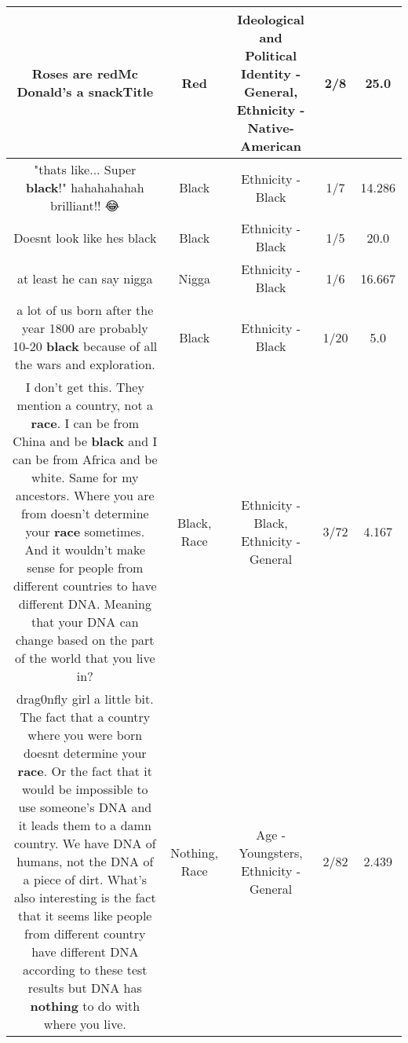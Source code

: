 \documentclass[11pt]{article}
\newlength\mylength
\begin{document}
\begin{center}
\begin{longtable}{|C{.65\mylength}|C{.30\mylength}|C{.12\mylength}|C{.12\mylength}|C{.12\mylength}|}
  \small Roses are \textbf{r\textbf{ed}}Mc Donald's a snackTitle\normalsize   & Red &  Ideological and Political Identity - General, Ethnicity - Native-American & 2/8 & 25.0 \\  \hline
  \small "thats like... Super \textbf{black}!" hahahahahah brilliant!! 😂\normalsize   & Black & Ethnicity - Black & 1/7 & 14.286 \\  \hline
  \small Doesnt look like hes black\normalsize   & Black & Ethnicity - Black & 1/5 & 20.0 \\  \hline
  \small at least he can say nigga\normalsize   & Nigga & Ethnicity - Black & 1/6 & 16.667 \\  \hline
  \small a lot of us born after the year 1800 are probably 10-20 \textbf{black} because of all the wars and exploration.\normalsize   & Black & Ethnicity - Black & 1/20 & 5.0 \\  \hline
  \small I don't get this. They mention a country, not a \textbf{race}. I can be from China and be \textbf{black} and I can be from Africa and be white. Same for my ancestors. Where you are from doesn't determine your \textbf{race} sometimes. And it wouldn't make sense for people from different countries to have different DNA. Meaning that your DNA can change based on the part of the world that you live in?\normalsize   & Black, Race & Ethnicity - Black, Ethnicity - General & 3/72 & 4.167 \\  \hline
  \small drag0nfly girl a little bit. The fact that a country where you were born doesnt determine your \textbf{race}. Or the fact that it would be impossible to use someone's DNA and it leads them to a damn country. We have DNA of humans, not the DNA of a piece of dirt. What's also interesting is the fact that it seems like people from different country have different DNA according to these test results but DNA has \textbf{nothing} to do with where you live.\normalsize   & Nothing, Race & Age - Youngsters, Ethnicity - General & 2/82 & 2.439 \\  \hline

\end{longtable}
\end{center}
\end{document}
